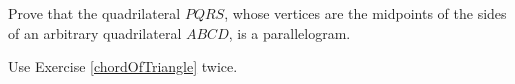 
\begin{Exercise}[
name={},
title={}, 
difficulty=0,
origin={\cite{SM}}]\label{quadParallelogram}
Prove that the quadrilateral $PQRS$, whose vertices are the midpoints of the sides of an arbitrary quadrilateral $ABCD$, is a parallelogram.
\end{Exercise}

\begin{Answer}
Use Exercise \ref{chordOfTriangle} twice.
\end{Answer}

